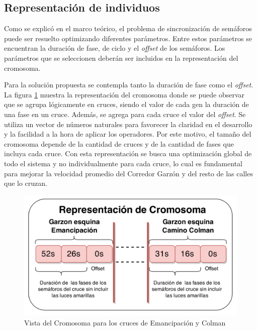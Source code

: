 \subsection{Representación de individuos}

Como se explicó en el marco teórico, el problema de sincronización de semáforos puede ser resuelto optimizando diferentes parámetros. Entre estos parámetros se encuentran la duración de fase, de ciclo y el \emph{offset} de los semáforos. Los parámetros que se seleccionen deberán ser incluidos en la representación del cromosoma.

Para la solución propuesta se contempla tanto la duración de fase como el \emph{offset}. La figura \ref{fig:cromosoma1} muestra la representación del cromosoma donde se puede observar que se agrupa lógicamente en cruces, siendo el valor de cada gen la duración de una fase en un cruce. Además, se agrega para cada cruce el valor del \emph{offset}. Se utiliza un vector de números naturales para favorecer la claridad en el desarrollo y la facilidad a la hora de aplicar los operadores. Por este motivo, el tamaño del cromosoma depende de la cantidad de cruces y de la cantidad de fases que incluya cada cruce. Con esta representación se busca una optimización global de todo el sistema y no individualmente para cada cruce, lo cual es fundamental para mejorar la velocidad promedio del Corredor Garzón y del resto de las calles que lo cruzan.

\begin{figure}[H]
	\centering
	\includegraphics[width=0.8\linewidth]{Figures/cromosoma1}
	\caption{Vista del Cromosoma para los cruces de Emancipación y Colman}
	\label{fig:cromosoma1}
\end{figure}

